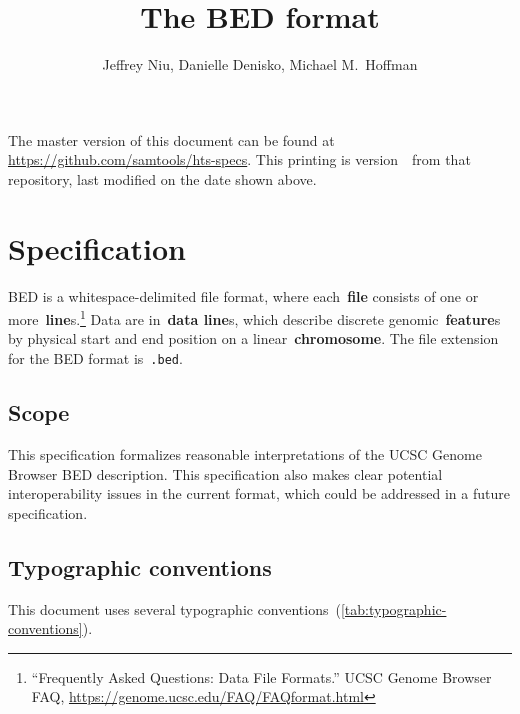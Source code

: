 \documentclass[11pt]{article}
\title{The \acf{BED} format}
\author{Jeffrey Niu, Danielle Denisko, Michael M.~Hoffman}
\date{\headdate}
\providecommand*{\Ac}[1]{\ac{#1}} %
\begin{document}
\maketitle

\begin{small}
\noindent
The master version of this document can be found at \url{https://github.com/samtools/hts-specs}.
This printing is version~\commitdesc\ from that repository, last modified on the date shown above.
\end{small}


\section{Specification}

\Ac{BED} is a whitespace-delimited file format, where each~\textbf{file} consists of one or more~\textbf{line}s.\footnote{``Frequently Asked Questions: Data File Formats.'' \ac{UCSC} Genome Browser FAQ, \url{https://genome.ucsc.edu/FAQ/FAQformat.html}}
Data are in~\textbf{data line}s, which describe discrete genomic~\textbf{feature}s by physical start and end position on a linear~\textbf{chromosome}.
The file extension for the \ac{BED} format is~\texttt{.bed}.

\subsection{Scope}

This specification formalizes reasonable interpretations of the \ac{UCSC} Genome Browser \ac{BED} description.
This specification also makes clear potential interoperability issues in the current format, which could be addressed in a future specification.

\subsection{Typographic conventions}

This document uses several typographic conventions~(\autoref{tab:typographic-conventions}).
\end{document}
